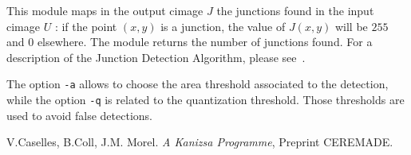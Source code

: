 This module maps in the output cimage $J$ the junctions found in 
the input cimage $U$ : if the point $(x,y)$ is a junction, the
value of $J(x,y)$ will be $255$ and $0$ elsewhere.
The module returns the number of junctions found.
For a description of the Junction Detection Algorithm, please
see~\cite{KP}.

The option \verb+-a+ allows to choose the area threshold associated
to the detection, while the option \verb+-q+ is related to the quantization 
threshold. Those thresholds are used to avoid false detections.

\begin{thebibliography}{Dau1}
 V.Caselles, B.Coll, J.M. Morel.
{\em A Kanizsa Programme}, Preprint CEREMADE.
\end{thebibliography}